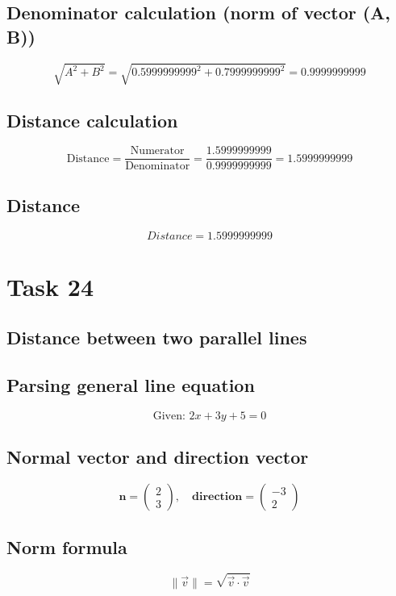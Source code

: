 \documentclass{article}
\begin{document}
\subsection*{ \vspace{1em} Denominator calculation (norm of vector (A, B))}
\[
\sqrt{A^2 + B^2} = \sqrt{0.5999999999^2 + 0.7999999999^2} = 0.9999999999
\]
\subsection*{ \vspace{1em} Distance calculation}
\[
\text{Distance} = \frac{\text{Numerator}}{\text{Denominator}} = \frac{1.5999999999}{0.9999999999} = 1.5999999999
\]
\subsection*{ \vspace{1em} Distance}
\[
Distance = 1.5999999999
\]
\bigskip

\hrulefill
\bigskip

\section*{Task 24}

\subsection*{Distance between two parallel lines}
\subsection*{ \vspace{1em} Parsing general line equation}
\[
\text{Given: } 2x + 3y + 5 = 0
\]
\subsection*{ \vspace{1em} Normal vector and direction vector}
\[
\mathbf{n} = \begin{pmatrix}2 \\ 3\end{pmatrix}, \quad
           \mathbf{direction} = \begin{pmatrix}-3 \\ 2\end{pmatrix}
\]
\subsection*{ \vspace{1em} Norm formula}
\[
\|\vec{v}\| = \sqrt{\vec{v} \cdot \vec{v}}
\]
\end{document}
